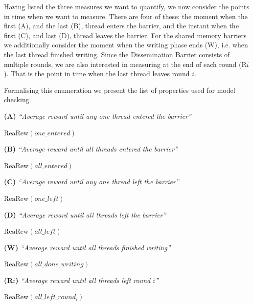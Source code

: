 \documentclass[a4paper, 10pt]{article}
\begin{document}
Having listed the three measures we want to quantify, we now consider the points in time when we want to measure.
There are four of these: the moment when the first (A), and the last (B), thread enters the barrier, and the instant when the first (C), and last (D), thread leaves the barrier.
For the shared memory barriers we additionally consider the moment when the writing phase ends (W), i.e. when the last thread finished writing.
Since the Dissemination Barrier consists of multiple rounds, we are also interested in measuring at the end of each round (R$i$). That is the point in time when the last thread leaves round $i$.

Formalising this enumeration we present the list of properties used for model checking.

\vspace{0.2cm}
\noindent \textbf{(A)} \emph{``Average reward until any one thread entered the barrier''}
\begin{center}
	$\mathrm{ReaRew}( \mathit{one\_entered} )$
\end{center}

\vspace{0.2cm}
\noindent \textbf{(B)} \emph{``Average reward until all threads entered the barrier''}
\begin{center}
	$\mathrm{ReaRew}( \mathit{all\_entered} )$
\end{center}

\vspace{0.2cm}
\noindent \textbf{(C)} \emph{``Average reward until any one thread left the barrier''}
\begin{center}
	$\mathrm{ReaRew}( \mathit{one\_left} )$
\end{center}

\vspace{0.2cm}
\noindent \textbf{(D)} \emph{``Average reward until all threads left the barrier''}
\begin{center}
	$\mathrm{ReaRew}( \mathit{all\_left} )$
\end{center}

\vspace{0.2cm}
\noindent \textbf{(W)} \emph{``Average reward until all threads finished writing''}
\begin{center}
	$\mathrm{ReaRew}( \mathit{all\_done\_writing} )$
\end{center}

\vspace{0.2cm}
\noindent \textbf{(R$i$)} \emph{``Average reward until all threads left round $i$''}
\begin{center}
	$\mathrm{ReaRew}( \mathit{all\_left\_round_{i}} )$
\end{center}
\end{document}

